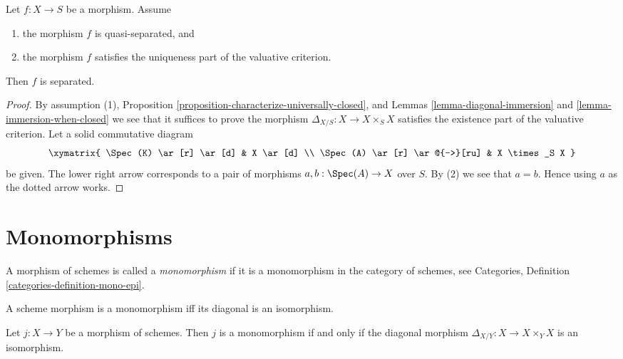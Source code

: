 \begin{lemma}
\label{lemma-valuative-criterion-separatedness}
\begin{reference}
\cite[II Proposition 7.2.3]{EGA}
\end{reference}
Let $f : X \to S$ be a morphism.
Assume
\begin{enumerate}
\item the morphism $f$ is quasi-separated, and
\item the morphism $f$ satisfies the uniqueness
part of the valuative criterion.
\end{enumerate}
Then $f$ is separated.
\end{lemma}

\begin{proof}
By assumption (1),
Proposition \ref{proposition-characterize-universally-closed}, and
Lemmas \ref{lemma-diagonal-immersion} and \ref{lemma-immersion-when-closed}
we see that it suffices to prove the morphism
$\Delta_{X/S} : X \to X \times_S X$ satisfies the existence
part of the valuative criterion.
Let a solid commutative diagram
$$
\xymatrix{
\Spec(K) \ar[r] \ar[d] & X \ar[d] \\
\Spec(A) \ar[r] \ar@{-->}[ru] & X \times_S X
}
$$
be given. The lower right arrow corresponds to a
pair of morphisms $a, b : \Spec(A) \to X$ over $S$.
By (2) we see that $a = b$. Hence using $a$ as the dotted
arrow works.
\end{proof}





\section{Monomorphisms}
\label{section-monomorphisms}

\begin{definition}
\label{definition-monomorphism}
A morphism of schemes is called a {\it monomorphism} if it is
a monomorphism in the category of schemes, see
Categories, Definition \ref{categories-definition-mono-epi}.
\end{definition}

\begin{lemma}
\label{lemma-monomorphism}
\begin{slogan}
A scheme morphism is a monomorphism iff its diagonal is an isomorphism.
\end{slogan}
Let $j : X \to Y$ be a morphism of schemes.
Then $j$ is a monomorphism if and only if the
diagonal morphism $\Delta_{X/Y} : X \to X \times_Y X$ is
an isomorphism.
\end{lemma}

